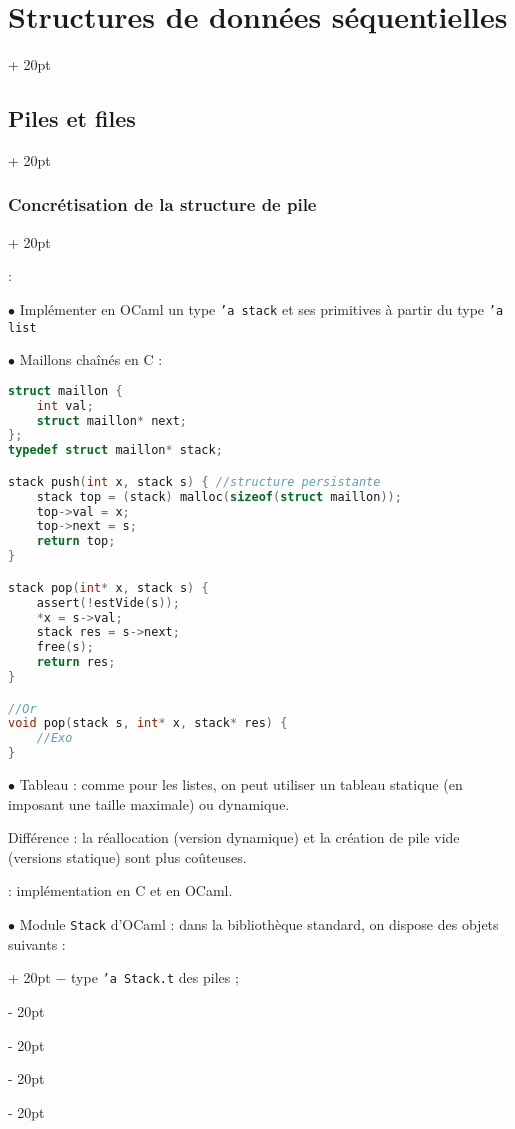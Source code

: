 \documentclass[a4paper, 12pt, twoside]{article}
\newcommand{\ind}[1][20pt]{\advance\leftskip + #1}
\newcommand{\deind}[1][20pt]{\advance\leftskip - #1}
\newenvironment{indt}[2][20pt]{#2 \par \ind[#1]}{\par \deind} %
\begin{document}
\begin{indt}{\section{Structures de données séquentielles}}
\begin{indt}{\subsection{Piles et files}}
\begin{indt}{\subsubsection{Concrétisation de la structure de pile}}
                \vspace{6pt}
                
                 :
                
                $\bullet$ Implémenter en OCaml un type \texttt{'a stack} et ses primitives à partir du type \texttt{'a list}
                
                $\bullet$ Maillons chaînés en C :
                
                \newpage
                
                \begin{lstlisting}[language=C, xleftmargin=80pt]
struct maillon {
    int val;
    struct maillon* next;
};
typedef struct maillon* stack;

stack push(int x, stack s) { //structure persistante
    stack top = (stack) malloc(sizeof(struct maillon));
    top->val = x;
    top->next = s;
    return top;
}

stack pop(int* x, stack s) {
    assert(!estVide(s));
    *x = s->val;
    stack res = s->next;
    free(s);
    return res;
}

//Or
void pop(stack s, int* x, stack* res) {
    //Exo
}\end{lstlisting}
                
                \vspace{6pt}
                
                $\bullet$ Tableau : comme pour les listes, on peut utiliser un tableau statique (en imposant une taille maximale) ou dynamique.
                
                Différence : la réallocation (version dynamique) et la création de pile vide (versions statique) sont plus coûteuses.
                
                \vspace{6pt}
                
                 : implémentation en C et en OCaml.
                
                \vspace{6pt}
                
                \begin{indt}{$\bullet$ Module \texttt{Stack} d'OCaml : dans la bibliothèque standard, on dispose des objets suivants :}
                    $-$ type \texttt{'a Stack.t} des piles ;
                    

\end{indt}
\end{indt}
\end{indt}
\end{indt}
\end{document}
